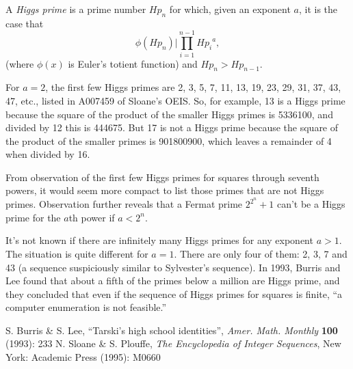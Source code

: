 \documentclass[12pt]{article}
\begin{document}
A {\em Higgs prime} is a prime number $Hp_n$ for which, given an exponent $a$, it is the case that $$\phi(Hp_n)|\prod_{i = 1}^{n - 1} {Hp_i}^a,$$ (where $\phi(x)$ is Euler's totient function) and $Hp_n > Hp_{n - 1}$.

For $a = 2$, the first few Higgs primes are 2, 3, 5, 7, 11, 13, 19, 23, 29, 31, 37, 43, 47, etc., listed in A007459 of Sloane's OEIS. So, for example, 13 is a Higgs prime because the square of the product of the smaller Higgs primes is 5336100, and divided by 12 this is 444675. But 17 is not a Higgs prime because the square of the product of the smaller primes is 901800900, which leaves a remainder of 4 when divided by 16.

From observation of the first few Higgs primes for squares through seventh powers, it would seem more compact to list those primes that are not Higgs primes. Observation further reveals that a Fermat prime $2^{2^n} + 1$ can't be a Higgs prime for the $a$th power if $a < 2^n$.

It's not known if there are infinitely many Higgs primes for any exponent $a > 1$. The situation is quite different for $a = 1$. There are only four of them: 2, 3, 7 and 43 (a sequence suspiciously similar to Sylvester's sequence). In 1993, Burris and Lee found that about a fifth of the primes below a million are Higgs prime, and they concluded that even if the sequence of Higgs primes for squares is finite, ``a computer enumeration is not feasible.''

\begin{thebibliography}{1}
 S. Burris \& S. Lee, ``Tarski's high school identities'', {\it Amer. Math. Monthly} {\bf 100} (1993): 233
 N. Sloane \& S. Plouffe, {\it The Encyclopedia of Integer Sequences}, New York: Academic Press (1995): M0660
\end{thebibliography}
\end{document}
